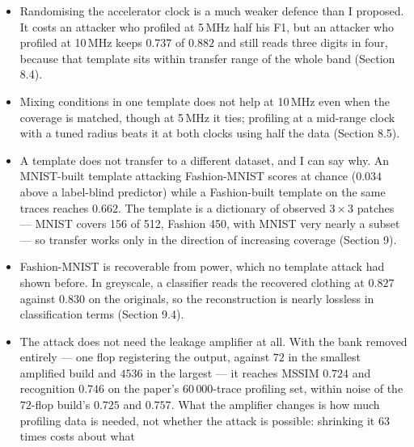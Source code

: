 \documentclass[11pt,a4paper]{article}
\begin{document}
\begin{itemize}
      below beats the reverse, and it holds only inside a band of roughly a factor of
      two. Section 8.3 replaces the ``profile at the highest clock'' rule I wrote from
      two frequencies, which a four-frequency grid showed to be wrong. For the 5 and
      10\,MHz pair, Section 8.7 then shows the asymmetry is not caused by the template
      match at all --- the failing direction retrieves and ranks the true patch
      \emph{better} than the working one, at every radius tested, so the loss happens
      in the reconstruction stage.
\item Randomising the accelerator clock is a much weaker defence than I proposed. It
      costs an attacker who profiled at 5\,MHz half his F1, but an attacker who
      profiled at 10\,MHz keeps $0.737$ of $0.882$ and still reads three digits in four,
      because that template sits within transfer range of the whole band (Section 8.4).
\item Mixing conditions in one template does not help at 10\,MHz even when the coverage
      is matched, though at 5\,MHz it ties; profiling at a mid-range clock with a tuned
      radius beats it at both clocks using half the data (Section 8.5).
\item A template does not transfer to a different dataset, and I can say why. An
      MNIST-built template attacking Fashion-MNIST scores at chance ($0.034$ above a
      label-blind predictor) while a Fashion-built template on the same traces reaches
      $0.662$. The template is a dictionary of observed $3\times3$ patches --- MNIST
      covers 156 of 512, Fashion 450, with MNIST very nearly a subset --- so transfer
      works only in the direction of increasing coverage (Section 9).
\item Fashion-MNIST is recoverable from power, which no template attack had shown
      before. In greyscale, a classifier reads the recovered clothing at $0.827$ against
      $0.830$ on the originals, so the reconstruction is nearly lossless in
      classification terms (Section 9.4).
\item The attack does not need the leakage amplifier at all. With the bank removed
      entirely --- one flop registering the output, against $72$ in the smallest amplified
      build and $4536$ in the largest --- it reaches MSSIM $0.724$ and recognition $0.746$
      on the paper's $60\,000$-trace profiling set, within noise of the $72$-flop build's
      $0.725$ and $0.757$. What the amplifier changes is how much profiling data is
      needed, not whether the attack is possible: shrinking it $63$ times costs about what

\end{itemize}
\end{document}
